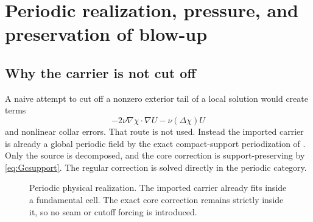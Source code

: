 \documentclass[11pt]{article}
\numberwithin{equation}{section}
\begin{document}
\section{Periodic realization, pressure, and preservation of blow-up}\label{sec:periodic}

\subsection{Why the carrier is not cut off}
A naive attempt to cut off a nonzero exterior tail of a local solution would create terms
\begin{equation}
-2\nu\nabla\chi\cdot\nabla U-\nu(\Delta\chi)U
\label{eq:cutofferror}
\end{equation}
and nonlinear collar errors.  That route is not used.  Instead the imported carrier is already a global periodic field by the exact compact-support periodization of \cite[Cor.~10.6]{OpenAI2026NS}.  Only the source is decomposed, and the core correction is support-preserving by \eqref{eq:Gcsupport}.  The regular correction is solved directly in the periodic category.

\begin{figure}[ht]
\centering
{}
\caption{Periodic physical realization.  The imported carrier already fits inside a fundamental cell.  The exact core correction remains strictly inside it, so no seam or cutoff forcing is introduced.}
\label{fig:torus}
\end{figure}
\end{document}
